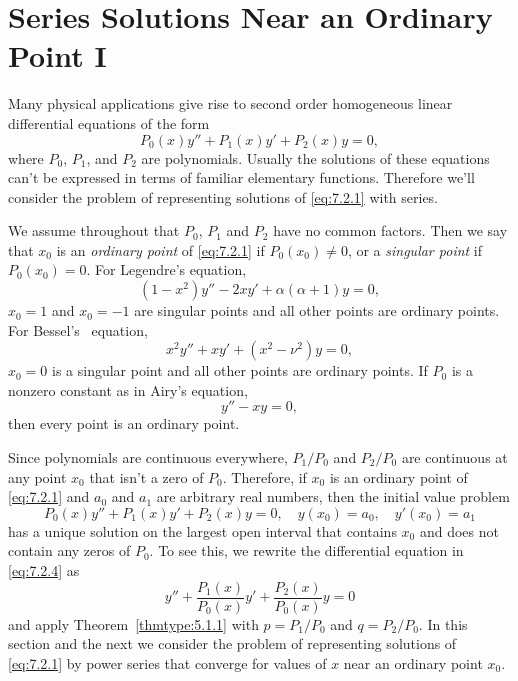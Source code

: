 \section{Series Solutions Near an Ordinary Point I}

\noindent
Many physical applications give rise to second order homogeneous linear differential equations of
the form
\begin{equation}
  \label{eq:7.2.1}P_{0}(x)y''+P_{1}(x)y'+P_{2}(x)y=0,
\end{equation}
where $P_{0}$, $P_{1}$, and $P_{2}$ are polynomials. Usually the solutions of these equations can't
be expressed in terms of familiar elementary functions. Therefore we'll consider the problem of
representing solutions of \eqref{eq:7.2.1} with series.

We assume throughout that $P_{0}$, $P_{1}$ and $P_{2}$ have no common factors. Then we say that
$x_{0}$ is an {\color{blue}\it ordinary point\/} of \eqref{eq:7.2.1} if $P_{0}(x_{0})\ne0$, or a
{\color{blue}\it singular point\/} if $P_{0}(x_{0})=0$. For Legendre's equation,
\begin{equation}
  \label{eq:7.2.2}(1-x^{2})y''-2xy'+\alpha(\alpha+1)y=0,
\end{equation}
$x_{0}=1$ and $x_{0}=-1$ are singular points and all other points are ordinary points. For Bessel's~
equation,
\[
  x^{2}y''+xy'+(x^{2}-\nu^{2})y=0,
\]
$x_{0}=0$ is a singular point and all other points are ordinary points. If $P_{0}$ is a nonzero
constant as in Airy's equation,
\begin{equation}
  \label{eq:7.2.3}y''-xy=0,
\end{equation}
then every point is an ordinary point.

Since polynomials are continuous everywhere, $P_{1}/P_{0}$ and $P_{2}/P_{0}$ are continuous at any
point $x_{0}$ that isn't a zero of $P_{0}$. Therefore, if $x_{0}$ is an ordinary point of
\eqref{eq:7.2.1} and $a_{0}$ and $a_{1}$ are arbitrary real numbers, then the initial value problem
\begin{equation}
  \label{eq:7.2.4}P_{0}(x)y''+P_{1}(x)y'+P_{2}(x)y=0,\quad y(x_{0})=a_{0},\quad y'(x_{0})=a_{1}
\end{equation}
has a unique solution on the largest open interval that contains $x_{0}$ and does not contain any
zeros of $P_{0}$. To see this, we rewrite the differential equation in \eqref{eq:7.2.4} as
\[
  y''+\frac{P_{1}(x)}{P_{0}(x)}y'+\frac{P_{2}(x)}{P_{0}(x)}y=0
\]
and apply Theorem~\ref{thmtype:5.1.1} with $p=P_{1}/P_{0}$ and $q=P_{2}/P_{0}$. In this section and
the next we consider the problem of representing solutions of \eqref{eq:7.2.1} by power series that
converge for values of $x$ near an ordinary point $x_{0}$.

